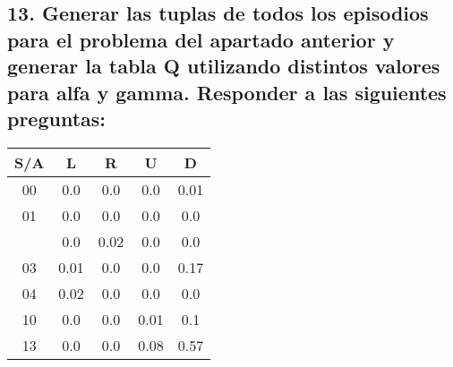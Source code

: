 \documentclass[10pt, spanish, pdftex]{../.template/template}
\begin{document}
\subsection{13. Generar las tuplas de todos los episodios para el problema del apartado anterior y generar la tabla Q utilizando distintos valores para alfa y gamma. Responder a las siguientes preguntas:}
\begin{table}[h!]
    \label{tablaqestoc}
    \centering
    \begin{tabular}{c|c|c|c|c|}
    \cline{2-5}
    S/A                                             & L                            & R                            & U    & D                            \\ \hline
    \multicolumn{1}{|c|}{00}                        & 0.0                          & 0.0                          & 0.0  & 0.01                         \\ \hline
    \multicolumn{1}{|c|}{01}                        & 0.0                          & 0.0                          & 0.0  & 0.0                          \\ \hline
    \rowcolor[HTML]{9AFF99} 
    \multicolumn{1}{|c|}{\cellcolor[HTML]{9AFF99}I} & 0.0                          & \cellcolor[HTML]{FD6864}0.02 & 0.0  & 0.0                          \\ \hline
    \multicolumn{1}{|c|}{03}                        & 0.01                         & 0.0                          & 0.0  & \cellcolor[HTML]{FD6864}0.17 \\ \hline
    \multicolumn{1}{|c|}{04}                        & 0.02                         & 0.0                          & 0.0  & 0.0                          \\ \hline
    \multicolumn{1}{|c|}{10}                        & 0.0                          & 0.0                          & 0.01 & 0.1                         \\ \hline
    \multicolumn{1}{|c|}{13}                        & 0.0                          & 0.0                          & 0.08 & \cellcolor[HTML]{FD6864}0.57 \\ \hline

\end{tabular}
\end{table}
\end{document}
